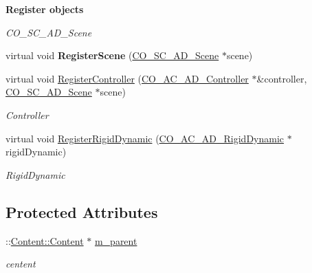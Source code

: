 \begin{Indent}{\bf Register objects}\par
{\em \label{_amgrpc49a66594c986a83bde3e868330feb0f}
 CO\_\-SC\_\-AD\_\-Scene }\begin{DoxyCompactItemize}
\item 
\hypertarget{classContent_1_1Physics_1_1Physics_ae6ebbcc2fa575960668a201f8a7c33e8}{
virtual void {\bfseries RegisterScene} (\hyperlink{classContent_1_1CO__SC__AD__Scene}{CO\_\-SC\_\-AD\_\-Scene} $\ast$scene)}
\label{classContent_1_1Physics_1_1Physics_ae6ebbcc2fa575960668a201f8a7c33e8}

\item 
\hypertarget{classContent_1_1Physics_1_1Physics_abcab788efcad77a85c0ccc7e2286b19e}{
virtual void \hyperlink{classContent_1_1Physics_1_1Physics_abcab788efcad77a85c0ccc7e2286b19e}{RegisterController} (\hyperlink{classContent_1_1Actor_1_1Admin_1_1Controller}{CO\_\-AC\_\-AD\_\-Controller} $\ast$\&controller, \hyperlink{classContent_1_1CO__SC__AD__Scene}{CO\_\-SC\_\-AD\_\-Scene} $\ast$scene)}
\label{classContent_1_1Physics_1_1Physics_abcab788efcad77a85c0ccc7e2286b19e}

\begin{DoxyCompactList}\small\item\em Controller \item\end{DoxyCompactList}\item 
\hypertarget{classContent_1_1Physics_1_1Physics_a4f9b98226a2b8c546925bf7c6d765e3a}{
virtual void \hyperlink{classContent_1_1Physics_1_1Physics_a4f9b98226a2b8c546925bf7c6d765e3a}{RegisterRigidDynamic} (\hyperlink{classContent_1_1Actor_1_1Admin_1_1RigidDynamic}{CO\_\-AC\_\-AD\_\-RigidDynamic} $\ast$rigidDynamic)}
\label{classContent_1_1Physics_1_1Physics_a4f9b98226a2b8c546925bf7c6d765e3a}

\begin{DoxyCompactList}\small\item\em RigidDynamic \item\end{DoxyCompactList}\end{DoxyCompactItemize}
\end{Indent}
\subsection*{Protected Attributes}
\begin{DoxyCompactItemize}
\item 
\hypertarget{classContent_1_1Physics_1_1Physics_a70edbde2d07d5097c5d64f05f8f1ee7f}{
::\hyperlink{classContent_1_1Content}{Content::Content} $\ast$ \hyperlink{classContent_1_1Physics_1_1Physics_a70edbde2d07d5097c5d64f05f8f1ee7f}{m\_\-parent}}
\label{classContent_1_1Physics_1_1Physics_a70edbde2d07d5097c5d64f05f8f1ee7f}

\begin{DoxyCompactList}\small\item\em centent \item\end{DoxyCompactList}\end{DoxyCompactItemize}


